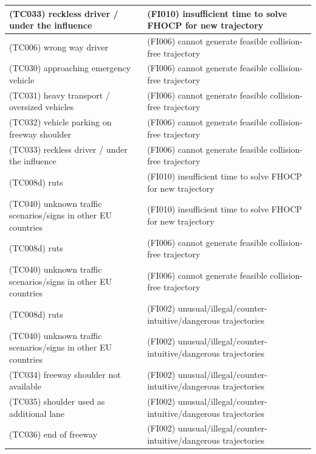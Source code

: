 \begin{longtable}{|p{8cm}|p{8cm}|}
\cellcolor{cGreen}(TC033) reckless driver / under the influence& \cellcolor{cBlue}(FI010) insufficient time to solve FHOCP for new trajectory\\\hline
\cellcolor{cGreen}(TC006) wrong way driver& \cellcolor{cBlue}(FI006) cannot generate feasible collision-free trajectory\\\hline
\cellcolor{cGreen}(TC030) approaching emergency vehicle& \cellcolor{cBlue}(FI006) cannot generate feasible collision-free trajectory\\\hline
\cellcolor{cGreen}(TC031) heavy transport / oversized vehicles& \cellcolor{cBlue}(FI006) cannot generate feasible collision-free trajectory\\\hline
\cellcolor{cGreen}(TC032) vehicle parking on freeway shoulder& \cellcolor{cBlue}(FI006) cannot generate feasible collision-free trajectory\\\hline
\cellcolor{cGreen}(TC033) reckless driver / under the influence& \cellcolor{cBlue}(FI006) cannot generate feasible collision-free trajectory\\\hline
\cellcolor{cRed}(TC008d) ruts& \cellcolor{cBlue}(FI010) insufficient time to solve FHOCP for new trajectory\\\hline
\cellcolor{cYellow}(TC040) unknown traffic scenarios/signs in other EU countries& \cellcolor{cBlue}(FI010) insufficient time to solve FHOCP for new trajectory\\\hline
\cellcolor{cRed}(TC008d) ruts& \cellcolor{cBlue}(FI006) cannot generate feasible collision-free trajectory\\\hline
\cellcolor{cYellow}(TC040) unknown traffic scenarios/signs in other EU countries& \cellcolor{cBlue}(FI006) cannot generate feasible collision-free trajectory\\\hline
\cellcolor{cRed}(TC008d) ruts& \cellcolor{cBlue}(FI002) unusual/illegal/counter-intuitive/dangerous trajectories\\\hline
\cellcolor{cYellow}(TC040) unknown traffic scenarios/signs in other EU countries& \cellcolor{cBlue}(FI002) unusual/illegal/counter-intuitive/dangerous trajectories\\\hline
\cellcolor{cYellow}(TC034) freeway shoulder not available& \cellcolor{cBlue}(FI002) unusual/illegal/counter-intuitive/dangerous trajectories\\\hline
\cellcolor{cYellow}(TC035) shoulder used as additional lane& \cellcolor{cBlue}(FI002) unusual/illegal/counter-intuitive/dangerous trajectories\\\hline
\cellcolor{cYellow}(TC036) end of freeway& \cellcolor{cBlue}(FI002) unusual/illegal/counter-intuitive/dangerous trajectories\\\hline

\end{longtable}
